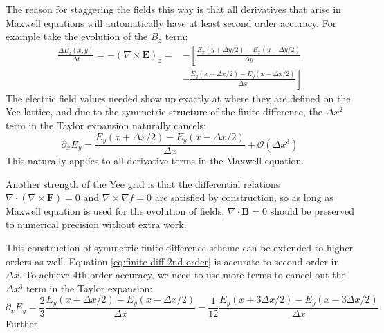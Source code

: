 The reason for staggering the fields this way is that all derivatives that arise
in Maxwell equations will automatically have at least second order accuracy. For
example take the evolution of the $B_z$ term:
\begin{equation}
  \begin{split}
    \frac{\Delta B_z(x, y)}{\Delta t} = -(\nabla\times \mathbf{E})_{z} = &-\left[ \frac{E_x(y + \Delta y/2) - E_x(y - \Delta y/2)}{\Delta y} \right. \\
      &- \left.\frac{E_y(x + \Delta x/2) - E_y(x - \Delta x/2)}{\Delta x} \right]
  \end{split}
\end{equation}
The electric field values needed show up exactly at where they are defined on
the Yee lattice, and due to the symmetric structure of the finite difference,
the $\Delta x^{2}$ term in the Taylor expansion naturally cancels:
\begin{equation}
  \label{eq:finite-diff-2nd-order}
\partial_xE_y = \frac{E_y(x + \Delta x/2) - E_y(x - \Delta x/2)}{\Delta x} + \mathcal{O}(\Delta x^3)
\end{equation}
This naturally applies to all derivative terms in the Maxwell equation.

Another strength of the Yee grid is that the differential relations
$\nabla\cdot(\nabla\times \mathbf{F}) = 0$ and $\nabla \times \nabla f = 0$ are
satisfied by construction, so as long as Maxwell equation is used for the
evolution of fields, $\nabla\cdot \mathbf{B} = 0$ should be preserved to
numerical precision without extra work.

This construction of symmetric finite difference scheme can be extended to
higher orders as well. Equation \eqref{eq:finite-diff-2nd-order} is accurate to
second order in $\Delta x$. To achieve 4th order accuracy, we need to use more
terms to cancel out the $\Delta x^{3}$ term in the Taylor expansion:
\begin{equation}
  \label{eq:finite-diff-4th-order}
  \partial_{x}E_y = \frac{2}{3}\frac{E_y(x + \Delta x/2) - E_y(x - \Delta x / 2)}{\Delta x} - \frac{1}{12}\frac{E_y(x + 3\Delta x / 2) - E_y(x - 3\Delta x / 2)}{\Delta x}
\end{equation}
Further


